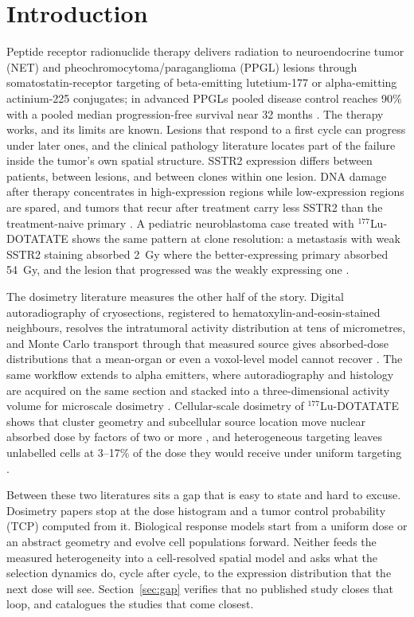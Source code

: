 \documentclass[11pt]{article}
\begin{document}
\section{Introduction}\label{sec:intro}

Peptide receptor radionuclide therapy delivers radiation to neuroendocrine tumor (NET) and
pheochromocytoma/paraganglioma (PPGL) lesions through somatostatin-receptor targeting of
beta-emitting lutetium-177 or alpha-emitting actinium-225 conjugates; in advanced PPGLs
pooled disease control reaches 90\% with a pooled median progression-free survival near
32 months \cite{su2023ppgl}. The therapy works, and
its limits are known. Lesions that respond to a first cycle can progress under later ones,
and the clinical pathology literature locates part of the failure inside the tumor's own
spatial structure. SSTR2 expression differs between patients, between lesions, and between
clones within one lesion. DNA damage after therapy concentrates in high-expression regions
while low-expression regions are spared, and tumors that recur after treatment carry less
SSTR2 than the treatment-naive primary \cite{feijtel2021,fransson2024}. A pediatric
neuroblastoma case treated with $^{177}$Lu-DOTATATE shows the same pattern at clone
resolution: a metastasis with weak SSTR2 staining absorbed 2~Gy where the better-expressing
primary absorbed 54~Gy, and the lesion that progressed was the weakly expressing one
\cite{fransson2024}.

The dosimetry literature measures the other half of the story. Digital autoradiography of
cryosections, registered to hematoxylin-and-eosin-stained neighbours, resolves the
intratumoral activity distribution at tens of micrometres, and Monte Carlo transport through
that measured source gives absorbed-dose distributions that a mean-organ or even a
voxol-level model cannot recover \cite{mellhammar2023}. The same workflow extends to
alpha emitters, where autoradiography and histology are acquired on the same section and
stacked into a three-dimensional activity volume for microscale dosimetry \cite{sahota2025}.
Cellular-scale dosimetry of $^{177}$Lu-DOTATATE shows that cluster geometry and subcellular
source location move nuclear absorbed dose by factors of two or more
\cite{tamborino2020,tamborino2025}, and heterogeneous targeting leaves unlabelled cells at
3--17\% of the dose they would receive under uniform targeting \cite{larouze2023}.

Between these two literatures sits a gap that is easy to state and hard to excuse. Dosimetry
papers stop at the dose histogram and a tumor control probability (TCP) computed from it.
Biological response models start from a uniform dose or an abstract geometry and evolve
cell populations forward. Neither feeds the measured heterogeneity into a cell-resolved
spatial model and asks what the selection dynamics do, cycle after cycle, to the expression
distribution that the next dose will see. Section~\ref{sec:gap} verifies that no published
study closes that loop, and catalogues the studies that come closest.
\end{document}
